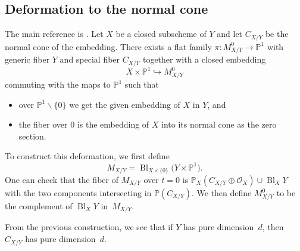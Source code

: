 \documentclass[pdftex]{sigma}
\numberwithin{equation}{section}
\newcommand{\PP}{\mathbb P}
\begin{document}
\subsection{Deformation to the normal cone}\label{sec:defnormal} The main reference is \cite[Chapter~5]{Fulton}. Let $X$ be a closed subscheme of $Y$ and let $C_{X/Y}$ be the normal cone of the embedding. There exists a flat family $\pi\colon M^0_{X/Y}\to \PP^1$ with generic fiber $Y$ and special fiber $C_{X/Y}$ together with a closed embedding
\[X\times \PP^1\hookrightarrow M^0_{X/Y}\]
 commuting with the maps to $\PP^1$ such that
 \begin{itemize}\itemsep=0pt
 \item over $\PP^1\backslash \{0\}$ we get the given embedding of $X$ in $Y$, and
 \item the fiber over $0$ is the embedding of $X$ into its normal cone as the zero section.
 \end{itemize}
To construct this deformation, we first define
\[M_{X/Y}=\operatorname{Bl}_{X\times \{0 \}} \big(Y\times \PP^1\big).\]
One can check that the fiber of $M_{X/Y}$ over $t=0$ is $\PP_X(C_{X/Y}\oplus \mathcal O_X)\cup\operatorname{Bl}_X Y$ with the two components intersecting in $\PP(C_{X/Y})$. We then define $M^0_{X/Y}$ to be the complement of $\operatorname{Bl}_X Y$ in~$M_{X/Y}$.
\begin{Remark}
From the previous construction, we see that if $Y$ has pure dimension~$d$, then~$C_{X/Y}$ has pure dimension~$d$.
\end{Remark}
\end{document}
